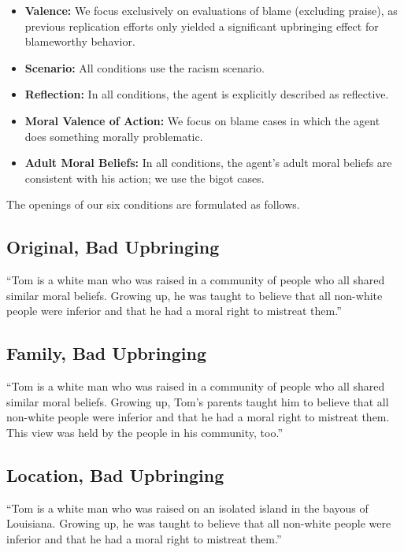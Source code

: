 \documentclass[scrarticle]{scrartcl}
\begin{document}
\begin{itemize}
   \item[(1)] \textsf{\textbf{Valence:}} We focus exclusively on evaluations of blame (excluding praise), as previous replication efforts only yielded a significant upbringing effect for blameworthy behavior.
   \item[(2)] \textsf{\textbf{Scenario:}} All conditions use the racism scenario.
   \item[(3)] \textsf{\textbf{Reflection:}} In all conditions, the agent is explicitly described as reflective.
   \item[(4)] \textsf{\textbf{Moral Valence of Action:}} We focus on blame cases in which the agent does something morally problematic.
   \item[(5)] \textsf{\textbf{Adult Moral Beliefs:}} In all conditions, the agent's adult moral beliefs are consistent with his action; we use the bigot cases.
\end{itemize}

\noindent The openings of our six conditions are formulated as follows.


\subsection*{Original, Bad Upbringing}
\enquote{Tom is a white man who was raised in a community of people who all shared similar moral beliefs.
Growing up, he was taught to believe that all non-white people were inferior and that he had a moral right to mistreat them.}


\subsection*{Family, Bad Upbringing}
\enquote{Tom is a white man who was raised in a community of people who all shared similar moral beliefs.
Growing up, Tom's parents taught him to believe that all non-white people were inferior and that he had a moral right to mistreat them.
This view was held by the people in his community, too.}


\subsection*{Location, Bad Upbringing}
\enquote{Tom is a white man who was raised on an isolated island in the bayous of Louisiana.
Growing up, he was taught to believe that all non-white people were inferior and that he had a moral right to mistreat them.}
\end{document}
